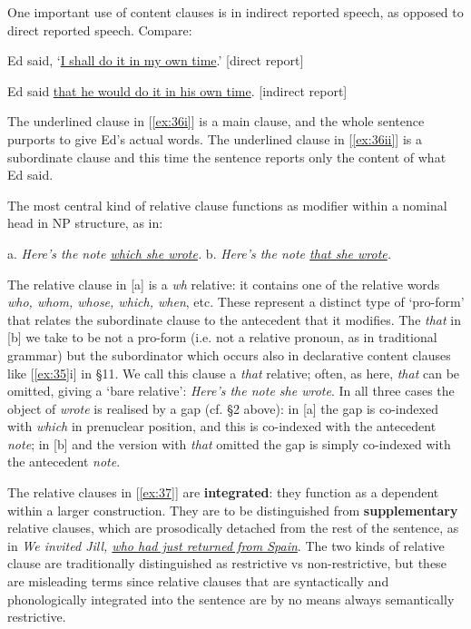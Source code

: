 One important use of content clauses is in {indirect reported speech}, as opposed to {direct reported speech}. Compare:
\begin{examples}
\item \label{ex:36}
    \begin{examples}
        \item \label{ex:36i} Ed said, `\uline{I shall do it in my own time}.' \hfill \textnormal{[direct report]}
        \item \label{ex:36ii} Ed said \uline{that he would do it in his own time}. \hfill \textnormal{[indirect report]}
    \end{examples}
\end{examples}
The underlined clause in [\ref{ex:36i}] is a main clause, and the whole sentence purports to give Ed's actual words. The underlined clause in [\ref{ex:36ii}] is a subordinate clause and this time the sentence reports only the content of what Ed said.


The most central kind of relative clause functions as modifier within a nominal head in NP structure, as in:
\begin{examples}
\item \label{ex:37}
        a. \textit{Here's \ob the note \uline{which she wrote}\cb.}\hspace{3em}
        b. \textit{Here's \ob the note \uline{that she wrote}\cb.}
\end{examples}
The relative clause in [a] is a {\textit{wh} relative}: it contains one of the relative words \textit{who, whom, whose, which, when}, etc. These represent a distinct type of `pro-form' that relates the subordinate clause to the antecedent that it modifies. The \textit{that} in [b] we take to be not a pro-form (i.e. not a relative pronoun, as in traditional grammar) but the subordinator which occurs also in declarative content clauses like [\ref{ex:35}i] in §11. We call this clause a {\textit{that} relative}; often, as here, \textit{that} can be omitted, giving a `{bare relative}': \textit{Here's \ob the note she wrote\cb}. In all three cases the object of \textit{wrote} is realised by a gap (cf. §2 above): in [a] the gap is co-indexed with \textit{which} in prenuclear position, and this is co-indexed with the antecedent \textit{note}; in [b] and the version with \textit{that} omitted the gap is simply co-indexed with the antecedent \textit{note}.

The relative clauses in [\ref{ex:37}] are \textbf{integrated}: they function as a dependent within a larger construction. They are to be distinguished from \textbf{supplementary} relative clauses, which are prosodically detached from the rest of the sentence, as in \textit{We invited Jill, \uline{who had just returned from Spain}}. The two kinds of relative clause are traditionally distinguished as restrictive vs non-restrictive, but these are misleading terms since relative clauses that are syntactically and phonologically integrated into the sentence are by no means always semantically restrictive.

